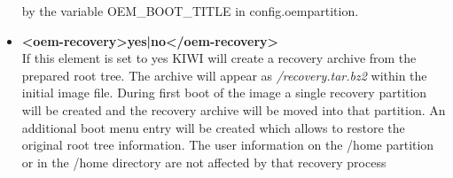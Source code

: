 \begin{itemize}
      by the variable OEM\_BOOT\_TITLE in config.oempartition.
\item \textbf{<oem-recovery>yes|no</oem-recovery>}\\
      If this element is set to yes KIWI will create a recovery archive
      from the prepared root tree. The archive will appear as
      \textit{/recovery.tar.bz2} within the initial image file. During
      first boot of the image a single recovery partition will be
      created and the recovery archive will be moved into that
      partition. An additional boot menu entry will be created which
      allows to restore the original root tree information. The
      user information on the /home partition or in the /home directory
      are not affected by that recovery process
\end{itemize}



